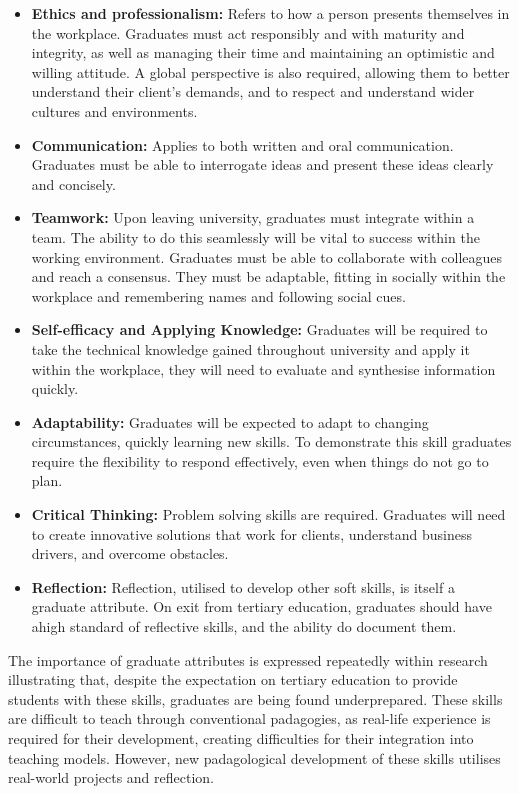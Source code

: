 \documentclass{l4proj}
\begin{document}
\begin{itemize}
    \item \textbf{Ethics and professionalism:} Refers to how a person presents themselves in the workplace. Graduates must act responsibly and with maturity and integrity, as well as managing their time and maintaining an optimistic and willing attitude. A global perspective is also required, allowing them to better understand their client's demands, and to respect and understand wider cultures and environments.
    \item \textbf{Communication:} Applies to both written and oral communication. Graduates must be able to interrogate ideas and present these ideas clearly and concisely.
    \item \textbf{Teamwork:} Upon leaving university, graduates must integrate within a team. The ability to do this seamlessly will be vital to success within the working environment. Graduates must be able to collaborate with colleagues and reach a consensus. They must be adaptable, fitting in socially within the workplace and remembering names and following social cues.
    \item \textbf{Self-efficacy and Applying Knowledge:} Graduates will be required to take the technical knowledge gained throughout university and apply it within the workplace, they will need to evaluate and synthesise information quickly.
    \item \textbf{Adaptability:} Graduates will be expected to adapt to changing circumstances, quickly learning new skills. To demonstrate this skill graduates require the flexibility to respond effectively, even when things do not go to plan. 
    \item \textbf{Critical Thinking:} Problem solving skills are required. Graduates will need to create innovative solutions that work for clients, understand business drivers, and overcome obstacles.
    \item \textbf{Reflection:} Reflection, utilised to develop other soft skills, is itself a graduate attribute. On exit from tertiary education, graduates should have ahigh standard of reflective skills, and the ability do document them. 
\end{itemize}

The importance of graduate attributes is expressed repeatedly within research illustrating that, despite the expectation on tertiary education to provide students with these skills, graduates are being found underprepared. These skills are difficult to teach through conventional padagogies, as real-life experience is required for their development, creating difficulties for their integration into teaching models\citep{barr_2019}. However, new padagological development of these skills utilises real-world projects and reflection.
 
\end{document}
